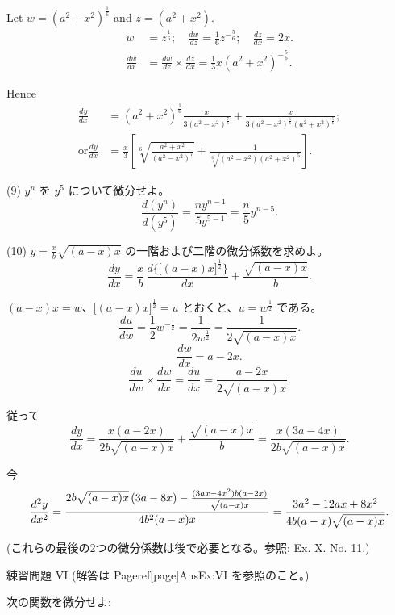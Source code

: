 \documentclass[a4paper,11pt,openany]{ltjsbook}
\begin{document}
Let $w = (a^2 + x^2)^{\frac{1}{6}}$ and $z = (a^2 + x^2)$.
\begin{align*}
w &= z^{\frac{1}{6}};\quad
  \frac{dw}{dz} = \frac{1}{6}z^{-\frac{5}{6}};\quad
  \frac{dz}{dx} = 2x. \\
%
\frac{dw}{dx} &= \frac{dw}{dz} \times \frac{dz}{dx} = \frac{1}{3} x(a^2 + x^2)^{-\frac{5}{6}}.
\end{align*}

Hence
\begin{align*}
\frac{dy}{dx} &= (a^2+x^2)^{\frac{1}{6}} \frac{x}{3(a^2-x^2)^{\frac{7}{6}}}
   + \frac{x}{3(a^2-x^2)^{\frac{1}{6}} (a^2+x^2)^{\frac{5}{6}}}; \\
%
\text{or}
\frac{dy}{dx} &= \frac{x}{3}
     \left[\sqrt[6]{\frac{a^2+x^2}{(a^2-x^2)^7}}
           + \frac{1}{\sqrt[6]{(a^2-x^2)(a^2+x^2)^5}} \right].
\end{align*}

(9) $y^n$ を $y^5$ について微分せよ。
\[
\frac{d(y^n)}{d(y^5)} = \frac{ny^{n-1}}{5y^{5-1}} = \frac{n}{5} y^{n-5}.
\]

(10) $y = \frac{x}{b} \sqrt{(a-x)x}$ の一階および二階の微分係数を求めよ。
\[
\frac{dy}{dx} = \frac{x}{b}\,
    \frac{d\bigl\{\bigl[(a-x)x\bigr]^{\frac{1}{2}}\bigr\}}{dx}
  + \frac{\sqrt{(a-x)x}}{b}.
\]

\((a-x)x = w\)、\(\bigl[(a-x)x\bigr]^{\frac{1}{2}} = u\) とおくと、\(u = w^{\frac{1}{2}}\) である。
\[
\frac{du}{dw}
  = \frac{1}{2} w^{-\frac{1}{2}}
  = \frac{1}{2w^{\frac{1}{2}}} = \frac{1}{2\sqrt{(a-x)x}}.
\]
\[
\frac{dw}{dx} = a-2x.
\]
\[
\frac{du}{dw} \times \frac{dw}{dx} = \frac{du}{dx} = \frac{a-2x}{2\sqrt{(a-x)x}}.
\]

従って
\[
\frac{dy}{dx}
  = \frac{x(a-2x)}{2b\sqrt{(a-x)x}} + \frac{\sqrt{(a-x)x}}{b}
  = \frac{x(3a-4x)}{2b\sqrt{(a-x)x}}.
\]

今
\[
\frac{d^2y}{dx^2}
  = \frac{2b \sqrt{(a-x)x}\, (3a-8x)
           - \frac{(3ax-4x^2)b(a-2x)}{\sqrt{(a-x)x}}}
          {4b^2(a-x)x} \\
  = \frac{3a^2-12ax+8x^2}{4b(a-x)\sqrt{(a-x)x}}.
\]

(これらの最後の2つの微分係数は後で必要となる。参照: Ex. X. No. 11.)

練習問題 VI (解答は Pageref[page]{AnsEx:VI} を参照のこと。)

次の関数を微分せよ:
\end{document}

